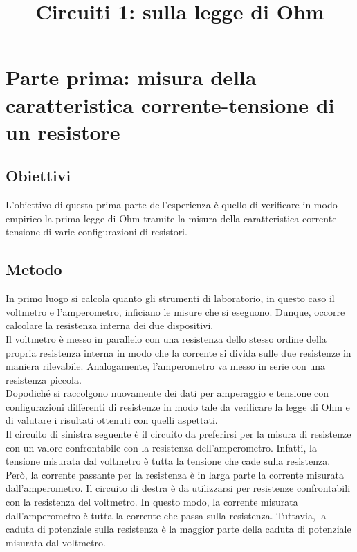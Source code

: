 \documentclass[a4paper]{article}
\begin{document}
\title{Circuiti 1: sulla legge di Ohm}
\maketitle
\tableofcontents
\clearpage
\section{Parte prima: misura della caratteristica corrente-tensione di un resistore}
\subsection{Obiettivi}
L'obiettivo di questa prima parte dell'esperienza è quello di verificare in modo empirico la prima legge di Ohm tramite la misura della caratteristica corrente-tensione di varie configurazioni di resistori.

\subsection{Metodo}
In primo luogo si calcola quanto gli strumenti di laboratorio, in questo caso il voltmetro e l'amperometro, inficiano le misure che si eseguono. Dunque, occorre calcolare la resistenza interna dei due dispositivi.\\
Il voltmetro è messo in parallelo con una resistenza dello stesso ordine della propria resistenza interna in modo che la corrente si divida sulle due resistenze in maniera rilevabile. Analogamente, l'amperometro va messo in serie con una resistenza piccola.\\
Dopodiché si raccolgono nuovamente dei dati per amperaggio e tensione con configurazioni differenti di resistenze in modo tale da verificare la legge di Ohm e di valutare i risultati ottenuti con quelli aspettati.\\
Il circuito di sinistra seguente è il circuito da preferirsi per la misura di resistenze con un valore confrontabile con la resistenza dell'amperometro. Infatti, la tensione misurata dal voltmetro è tutta la tensione che cade sulla resistenza. Però, la corrente passante per la resistenza è in larga parte la corrente misurata dall'amperometro.
Il circuito di destra è da utilizzarsi per resistenze confrontabili con la resistenza del voltmetro. In questo modo, la corrente misurata dall'amperometro è tutta la corrente che passa sulla resistenza. Tuttavia, la caduta di potenziale sulla resistenza è la maggior parte della caduta di potenziale misurata dal voltmetro.
\end{document}
